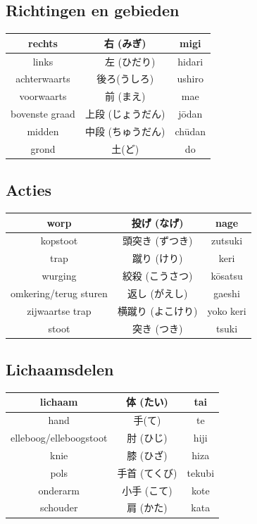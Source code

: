 \documentclass[12pt]{scrartcl}
\begin{document}
\begin{CJK*}{UTF8}{min}
\subsection{Richtingen en gebieden}
\begin{table}[H]
\begin{center}
\begin{tabular}{c|c|c}
rechts & 右 (みぎ) & migi \\
\hline
links &　左 (ひだり) & hidari\\
\hline
achterwaarts & 後ろ(うしろ) & ushiro\\
\hline
voorwaarts & 前 (まえ) & mae\\
\hline
bovenste graad & 上段 (じょうだん) & j\={o}dan\\
\hline
midden & 中段 (ちゅうだん) & ch\={u}dan\\
\hline
grond & 土(ど) & do
\end{tabular}
\end{center}
\end{table}

\subsection{Acties}
\begin{table}[H]
\begin{center}
\begin{tabular}{c|c|c}
worp & 投げ (なげ) & nage\\
\hline
kopstoot & 頭突き (ずつき) & zutsuki\\
\hline
trap & 蹴り (けり) & keri\\
\hline
wurging & 絞殺 (こうさつ) & k\={o}satsu\\
\hline
omkering/terug sturen & 返し (がえし) & gaeshi\\
\hline
zijwaartse trap & 横蹴り (よこけり) & yoko keri\\
\hline
stoot & 突き (つき) & tsuki
\end{tabular}
\end{center}
\end{table}

\subsection{Lichaamsdelen}
\begin{table}[H]
\begin{center}
\begin{tabular}{c|c|c}
lichaam & 体 (たい) & tai \\
\hline
hand & 手(て) & te \\
\hline
elleboog/elleboogstoot & 肘 (ひじ) & hiji\\
\hline
knie & 膝 (ひざ) & hiza\\
\hline
pols & 手首 (てくび) & tekubi\\
\hline
onderarm & 小手 (こて) & kote\\
\hline
schouder & 肩 (かた) & kata
\end{tabular}
\end{center}
\end{table}


\end{CJK*}
\end{document}
